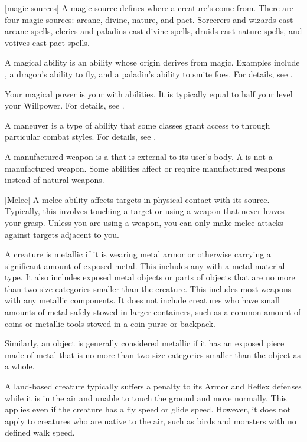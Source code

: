 [magic sources] A magic source defines where a creature's  come from.
There are four magic sources: arcane, divine, nature, and pact.
Sorcerers and wizards cast arcane spells, clerics and paladins cast divine spells, druids cast nature spells, and votives cast pact spells.

 A magical ability is an ability whose origin derives from magic.
Examples include , a dragon's ability to fly, and a paladin's ability to smite foes.
For details, see .

 Your magical power is your  with \magical abilities.
It is typically equal to half your level \add your Willpower.
For details, see .

 A maneuver is a type of  ability that some classes grant access to through particular combat styles.
For details, see .

 A manufactured weapon is a  that is external to its user's body.
A  is not a manufactured weapon.
Some abilities affect or require manufactured weapons instead of natural weapons.

[Melee] A melee ability affects targets in physical contact with its source.
Typically, this involves touching a target or using a weapon that never leaves your grasp.
Unless you are using a  weapon, you can only make melee attacks against targets adjacent to you.

 A creature is metallic if it is wearing metal armor or otherwise carrying a significant amount of exposed metal.
This includes any  with a metal material type.
It also includes exposed metal objects or parts of objects that are no more than two size categories smaller than the creature.
This includes most weapons with any metallic components.
It does not include creatures who have small amounts of metal safely stowed in larger containers, such as a common amount of coins or metallic tools stowed in a coin purse or backpack.

Similarly, an object is generally considered metallic if it has an exposed piece made of metal that is no more than two size categories smaller than the object as a whole.

 A land-based creature typically suffers a  penalty to its Armor and Reflex defenses while it is in the air and unable to touch the ground and move normally.
This applies even if the creature has a fly speed or glide speed.
However, it does not apply to creatures who are native to the air, such as birds and monsters with no defined walk speed.

